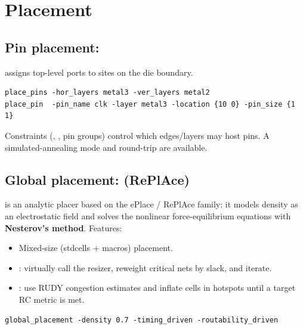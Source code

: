 \chapter{Placement}
\label{ch:place}


\section{Pin placement: }

 assigns top-level ports to sites on the die boundary.

\begin{lstlisting}[style=ortcl]
place_pins -hor_layers metal3 -ver_layers metal2
place_pin  -pin_name clk -layer metal3 -location {10 0} -pin_size {1 1}
\end{lstlisting}

Constraints (, ,
pin groups) control which edges/layers may host pins. A simulated-annealing
mode and  round-trip are available.

\section{Global placement:  (RePlAce)}

 is an analytic placer based on the ePlace / RePlAce family:
it models density as an electrostatic field and solves the nonlinear
force-equilibrium equations with \textbf{Nesterov's method}. Features:

\begin{itemize}
  \item Mixed-size (stdcells + macros) placement.
  \item {}: virtually call the resizer, reweight critical
        nets by slack, and iterate.
  \item {}: use RUDY congestion estimates and inflate
        cells in hotspots until a target RC metric is met.
\end{itemize}

\begin{lstlisting}[style=ortcl]
global_placement -density 0.7 -timing_driven -routability_driven
\end{lstlisting}

